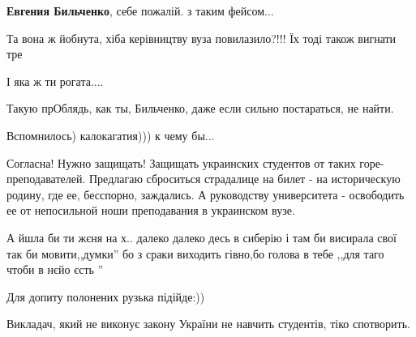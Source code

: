 \begin{itemize}
\begin{itemize}
\textbf{Евгения Бильченко}, себе пожалій. з таким фейсом...
\end{itemize}

 
Та вона ж йобнута, хіба керівництву вуза повилазило?!!! Їх тоді також вигнати тре

 
І яка ж ти рогата....

 
Такую прОблядь, как ты, Бильченко, даже если сильно постараться, не найти.

 
Вспомнилось) калокагатия))) к чему бы...

 

Согласна! Нужно защищать! Защищать украинских студентов от таких
горе-преподавателей. Предлагаю сброситься страдалице на билет - на историческую
родину, где ее, бесспорно, заждались. А руководству университета - освободить
ее от непосильной ноши преподавания в украинском вузе.

 

А йшла би ти жєня на х.. далеко далеко десь в сиберію і там би висирала свої
так би мовити,,думки'' бо з сраки виходить гівно,бо голова в тебе ,,для таго
чтоби в нєйо єсть ''

 
Для допиту полонених рузька підійде:))

Викладач, який не виконує закону України не навчить студентів, тіко спотворить.


\end{itemize}
